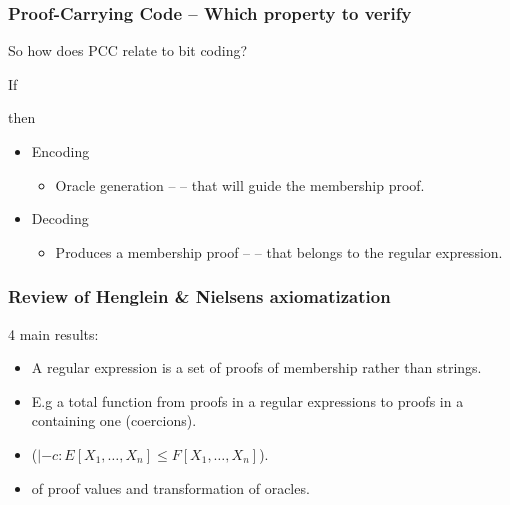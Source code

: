 \documentclass[slidestop,compress,mathserif, xcolor=table]{beamer}
\begin{document}
\begin{frame}
  \frametitle{Proof-Carrying Code -- Which property to verify}
  
  So how does PCC relate to bit coding?\newline


  If

  \begin{block}{}
  \end{block}

  then
  
  \begin{itemize}
    
  \item Encoding
    \begin{itemize}
    \item Oracle generation --  -- that will guide the membership proof.
    \end{itemize}
    
  \item Decoding
    \begin{itemize}
    \item Produces a membership proof --  -- that
      belongs to the regular expression.
    \end{itemize}
    
  \end{itemize}
  
\end{frame}

\begin{frame}
  \frametitle{Review of Henglein \& Nielsens\cite{heni2010} axiomatization}
  4 main results:
  \begin{itemize}
  \item {} A regular expression is a set of proofs of
    membership rather than strings.
  \item {} E.g a total function from
    proofs in a regular expressions to proofs in a containing one (coercions).
  \item {} ($|- c : E[X_1, \ldots, X_n] \leq F[X_1,
    \ldots, X_n]$).
  \item {} of proof values and transformation of oracles.
  \end{itemize}
\end{frame}
\end{document}
